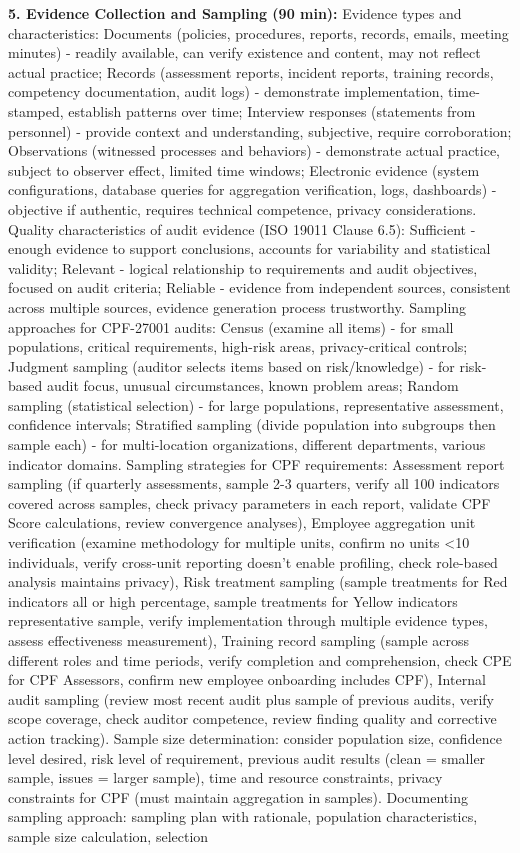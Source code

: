 \documentclass[11pt,a4paper]{article}
\begin{document}
\textbf{5. Evidence Collection and Sampling (90 min):} Evidence types and characteristics: Documents (policies, procedures, reports, records, emails, meeting minutes) - readily available, can verify existence and content, may not reflect actual practice; Records (assessment reports, incident reports, training records, competency documentation, audit logs) - demonstrate implementation, time-stamped, establish patterns over time; Interview responses (statements from personnel) - provide context and understanding, subjective, require corroboration; Observations (witnessed processes and behaviors) - demonstrate actual practice, subject to observer effect, limited time windows; Electronic evidence (system configurations, database queries for aggregation verification, logs, dashboards) - objective if authentic, requires technical competence, privacy considerations. Quality characteristics of audit evidence (ISO 19011 Clause 6.5): Sufficient - enough evidence to support conclusions, accounts for variability and statistical validity; Relevant - logical relationship to requirements and audit objectives, focused on audit criteria; Reliable - evidence from independent sources, consistent across multiple sources, evidence generation process trustworthy. Sampling approaches for CPF-27001 audits: Census (examine all items) - for small populations, critical requirements, high-risk areas, privacy-critical controls; Judgment sampling (auditor selects items based on risk/knowledge) - for risk-based audit focus, unusual circumstances, known problem areas; Random sampling (statistical selection) - for large populations, representative assessment, confidence intervals; Stratified sampling (divide population into subgroups then sample each) - for multi-location organizations, different departments, various indicator domains. Sampling strategies for CPF requirements: Assessment report sampling (if quarterly assessments, sample 2-3 quarters, verify all 100 indicators covered across samples, check privacy parameters in each report, validate CPF Score calculations, review convergence analyses), Employee aggregation unit verification (examine methodology for multiple units, confirm no units <10 individuals, verify cross-unit reporting doesn't enable profiling, check role-based analysis maintains privacy), Risk treatment sampling (sample treatments for Red indicators all or high percentage, sample treatments for Yellow indicators representative sample, verify implementation through multiple evidence types, assess effectiveness measurement), Training record sampling (sample across different roles and time periods, verify completion and comprehension, check CPE for CPF Assessors, confirm new employee onboarding includes CPF), Internal audit sampling (review most recent audit plus sample of previous audits, verify scope coverage, check auditor competence, review finding quality and corrective action tracking). Sample size determination: consider population size, confidence level desired, risk level of requirement, previous audit results (clean = smaller sample, issues = larger sample), time and resource constraints, privacy constraints for CPF (must maintain aggregation in samples). Documenting sampling approach: sampling plan with rationale, population characteristics, sample size calculation, selection 
\end{document}
